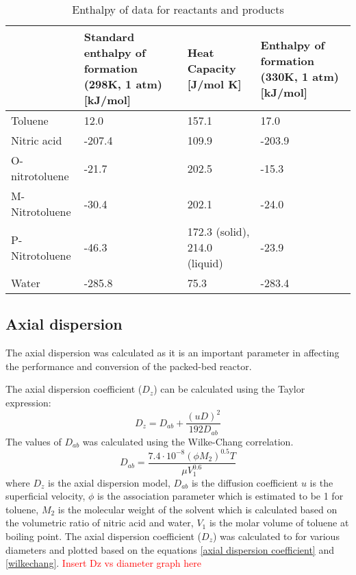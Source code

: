 \begin{table}[H]
\centering
\caption{Enthalpy of data for reactants and products}
\label{tab:Heat enthalpy table}
\begin{tabularx}{\linewidth}{l|XXX}
\toprule
                                                                & Standard enthalpy of formation (298K, 1 atm) [kJ/mol] & Heat Capacity [J/mol K] & Enthalpy of formation (330K, 1 atm) [kJ/mol] \\ \midrule
Toluene                        & 12.0              & 157.1              & 17.0                     \\
Nitric acid                      & -207.4              & 109.9              & -203.9                       \\
O-nitrotoluene & -21.7             & 202.5              & -15.3              \\ 
M-Nitrotoluene                      & -30.4              & 202.1             & -24.0                       \\
P-Nitrotoluene                      & -46.3              & 172.3 (solid), 214.0 (liquid)             & -23.9                        \\
Water                     & -285.8              & 75.3              & -283.4                        \\
\bottomrule
\end{tabularx}
\end{table}

\subsection{Axial dispersion}
\label{sec:axialdispersion}
The axial dispersion was calculated as it is an important parameter in affecting the performance and conversion of the packed-bed reactor. 

The axial dispersion coefficient ($D_z$) can be calculated using the Taylor expression: 
\begin{equation}
    D_z=D_{ab}+\frac{(uD)^2}{192D_{ab}}
    \label{axial dispersion coefficient}
\end{equation}
The values of $D_{ab}$ was calculated using the Wilke-Chang correlation.
\begin{equation}
    D_{ab}=\frac{7.4\cdot 10^{-8}(\phi M_2)^{0.5}T}{\mu V_1^{0.6}}
    \label{wilkechang}
\end{equation}
where $D_z$ is the axial dispersion model, $D_{ab}$ is the diffusion coefficient $u$ is the superficial velocity, $\phi$ is the association parameter which is estimated to be 1 for toluene, $M_2$ is the molecular weight of the solvent which is calculated based on the volumetric ratio of nitric acid and water, $V_1$ is the molar volume of toluene at boiling point.
The axial dispersion coefficient ($D_z$) was calculated to for various diameters and plotted based on the equations \ref{axial dispersion coefficient} and \ref{wilkechang}.
\textcolor{red}{Insert Dz vs diameter graph here} 



